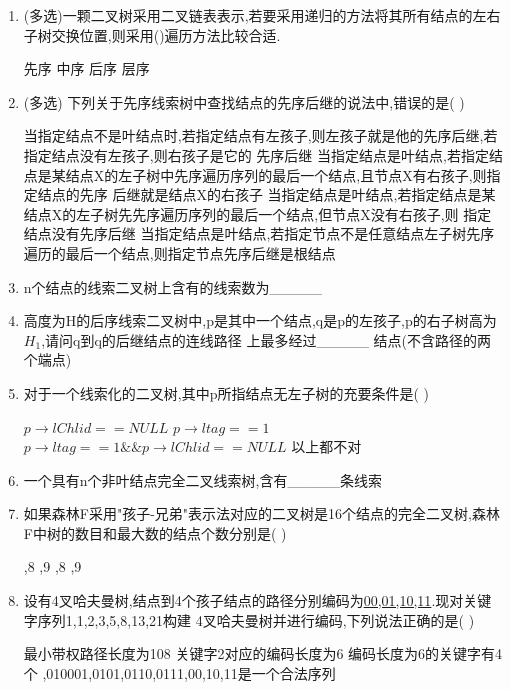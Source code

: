 \documentclass[12pt, a4paper, oneside, UTF8]{ctexbook}
\begin{document}
\begin{enumerate}
    \item (多选)一颗二叉树采用二叉链表表示,若要采用递归的方法将其所有结点的左右子树交换位置,则采用()遍历方法比较合适. 
    \begin{choices}
        \task 先序 
        \task 中序 
        \task 后序 
        \task 层序
    \end{choices}

    \item (多选) 下列关于先序线索树中查找结点的先序后继的说法中,错误的是(    ) 
    \begin{choices}[1]
        \task 当指定结点不是叶结点时,若指定结点有左孩子,则左孩子就是他的先序后继,若指定结点没有左孩子,则右孩子是它的
        先序后继 
        \task 当指定结点是叶结点,若指定结点是某结点X的左子树中先序遍历序列的最后一个结点,且节点X有右孩子,则指定结点的先序
        后继就是结点X的右孩子 
        \task 当指定结点是叶结点,若指定结点是某结点X的左子树先先序遍历序列的最后一个结点,但节点X没有右孩子,则
        指定结点没有先序后继 
        \task 当指定结点是叶结点,若指定节点不是任意结点左子树先序遍历的最后一个结点,则指定节点先序后继是根结点 
    \end{choices}

    \item n个结点的线索二叉树上含有的线索数为\_\_\_\_\_ 
    \item 高度为H的后序线索二叉树中,p是其中一个结点,q是p的左孩子,p的右子树高为$H_1$,请问q到q的后继结点的连线路径
    上最多经过\_\_\_\_\_ 结点(不含路径的两个端点) 

    \item 对于一个线索化的二叉树,其中p所指结点无左子树的充要条件是(   ) 
    \begin{choices}[1]
        \task $p\rightarrow lChlid == NULL$
        \task $p\rightarrow ltag == 1$ 
        \task $p\rightarrow ltag == 1 \&\& p\rightarrow lChlid == NULL$
        \task 以上都不对
    \end{choices}

    \item 一个具有n个非叶结点完全二叉线索树,含有\_\_\_\_\_条线索 

    \item 如果森林F采用"孩子-兄弟"表示法对应的二叉树是16个结点的完全二叉树,森林F中树的数目和最大数的结点个数分别是(   ) 
    \begin{choices}
        ,8
        ,9
        ,8
        ,9
    \end{choices}

    \item 设有4叉哈夫曼树,结点到4个孩子结点的路径分别编码为\underline{00,01,10,11}.现对关键字序列1,1,2,3,5,8,13,21构建
    4叉哈夫曼树并进行编码,下列说法正确的是(    ) 
    \begin{choices}[1]
        \task 最小带权路径长度为108
        \task 关键字2对应的编码长度为6
        \task 编码长度为6的关键字有4个 
        ,010001,0101,0110,0111,00,10,11是一个合法序列 
    \end{choices}


\end{enumerate}
\end{document}

